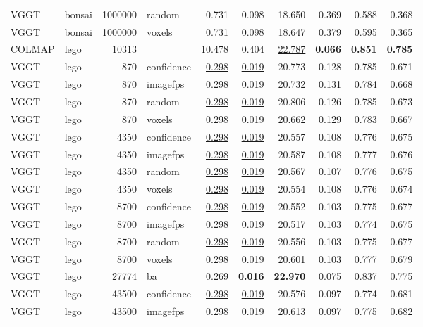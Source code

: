 \begin{table}[H]
\begin{tabular}{llrlrrrrrr}
VGGT & bonsai & 1000000 & random & 0.731 & 0.098 & 18.650 & 0.369 & 0.588 & 0.368 \\
VGGT & bonsai & 1000000 & voxels & 0.731 & 0.098 & 18.647 & 0.379 & 0.595 & 0.365 \\
\midrule
COLMAP & lego & 10313 &  & 10.478 & 0.404 & \underline{22.787} & \textbf{0.066} & \textbf{0.851} & \textbf{0.785} \\
VGGT & lego & 870 & confidence & \underline{0.298} & \underline{0.019} & 20.773 & 0.128 & 0.785 & 0.671 \\
VGGT & lego & 870 & imagefps & \underline{0.298} & \underline{0.019} & 20.732 & 0.131 & 0.784 & 0.668 \\
VGGT & lego & 870 & random & \underline{0.298} & \underline{0.019} & 20.806 & 0.126 & 0.785 & 0.673 \\
VGGT & lego & 870 & voxels & \underline{0.298} & \underline{0.019} & 20.662 & 0.129 & 0.783 & 0.667 \\
VGGT & lego & 4350 & confidence & \underline{0.298} & \underline{0.019} & 20.557 & 0.108 & 0.776 & 0.675 \\
VGGT & lego & 4350 & imagefps & \underline{0.298} & \underline{0.019} & 20.587 & 0.108 & 0.777 & 0.676 \\
VGGT & lego & 4350 & random & \underline{0.298} & \underline{0.019} & 20.567 & 0.107 & 0.776 & 0.675 \\
VGGT & lego & 4350 & voxels & \underline{0.298} & \underline{0.019} & 20.554 & 0.108 & 0.776 & 0.674 \\
VGGT & lego & 8700 & confidence & \underline{0.298} & \underline{0.019} & 20.552 & 0.103 & 0.775 & 0.677 \\
VGGT & lego & 8700 & imagefps & \underline{0.298} & \underline{0.019} & 20.517 & 0.103 & 0.774 & 0.675 \\
VGGT & lego & 8700 & random & \underline{0.298} & \underline{0.019} & 20.556 & 0.103 & 0.775 & 0.677 \\
VGGT & lego & 8700 & voxels & \underline{0.298} & \underline{0.019} & 20.601 & 0.103 & 0.777 & 0.679 \\
VGGT & lego & 27774 & ba & 0.269 & \textbf{0.016} & \textbf{22.970} & \underline{0.075} & \underline{0.837} & \underline{0.775} \\
VGGT & lego & 43500 & confidence & \underline{0.298} & \underline{0.019} & 20.576 & 0.097 & 0.774 & 0.681 \\
VGGT & lego & 43500 & imagefps & \underline{0.298} & \underline{0.019} & 20.613 & 0.097 & 0.775 & 0.682 \\

\end{tabular}
\end{table}

